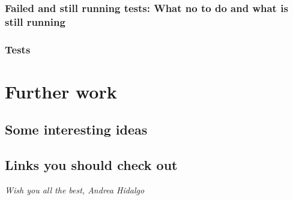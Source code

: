 \documentclass[11pt,fleqn]{book} %
\begin{document}
\subsubsection{Failed and still running tests: What no to do and what is still running}


\subsubsection{Tests}


\section{Further work}


\subsection{Some interesting ideas}

\subsection{Links you should check out}

\vfill
\textit{Wish you all the best, Andrea Hidalgo}
\end{document}
